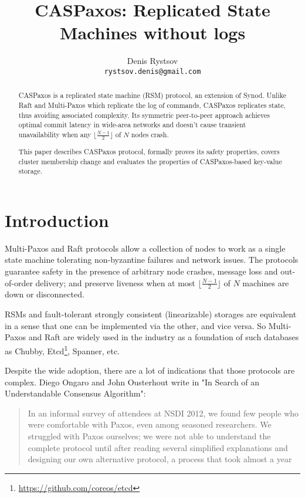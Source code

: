 \documentclass[12pt]{article}
\theoremstyle{definition}
\begin{document}
\title{CASPaxos: Replicated State Machines without logs}

\author{Denis Rystsov\\\texttt{rystsov.denis@gmail.com}}

\maketitle

\begin{abstract}
CASPaxos is a replicated state machine (RSM) protocol, an extension of Synod. Unlike Raft and Multi-Paxos which replicate the log of commands, CASPaxos replicates state, thus avoiding associated complexity. Its symmetric peer-to-peer approach achieves optimal commit latency in wide-area networks and doesn't cause transient unavailability when any $\lfloor \frac{N-1}2 \rfloor$ of $N$ nodes crash.

This paper describes CASPaxos protocol, formally proves its safety properties, covers cluster membership change and evaluates the properties of CASPaxos-based key-value storage.
\end{abstract}

\section{Introduction}

Multi-Paxos\cite{lamport01} and Raft\cite{raft} protocols allow a collection of nodes to work as a single state machine tolerating non-byzantine failures and network issues. The protocols guarantee safety in the presence of arbitrary node crashes, message loss and out-of-order delivery; and preserve liveness when at most $\lfloor \frac{N-1}2 \rfloor$ of $N$ machines are down or disconnected.

RSMs and fault-tolerant strongly consistent (linearizable) storages are equivalent in a sense that one can be implemented via the other, and vice versa. So Multi-Paxos and Raft are widely used in the industry as a foundation of such databases as Chubby\cite{chubby}, Etcd\footnote{\href{https://github.com/coreos/etcd}{https://github.com/coreos/etcd}}, Spanner\cite{spanner}, etc.

Despite the wide adoption, there are a lot of indications that those protocols are complex. Diego Ongaro and John Ousterhout write in "In Search of an Understandable Consensus Algorithm"\cite{raft}:

\begin{quote}
In an informal survey of attendees at NSDI 2012, we found few people who were comfortable with Paxos, even among seasoned researchers. We struggled with Paxos ourselves; we were not able to understand the complete protocol until after reading several simplified explanations and designing our own alternative protocol, a process that took almost a year
\end{quote}
\end{document}
